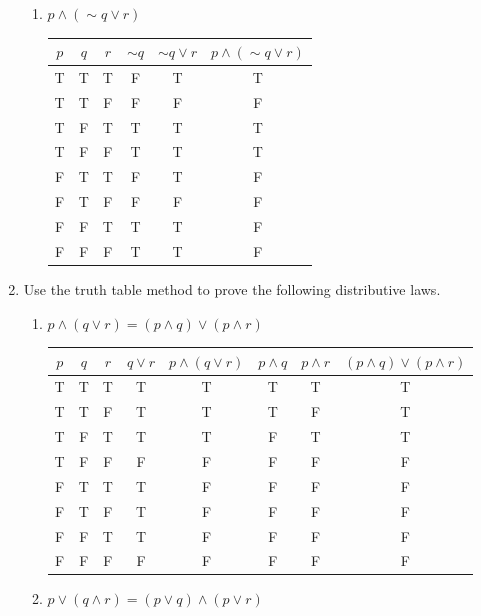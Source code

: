 \documentclass{article}
\begin{document}
\begin{enumerate}
\begin{enumerate}
			\item \( p \land (\sim q \lor r) \) \\
			
			\begin{tabular}{|c|c|c|c|c|c|}
				\hline
				$p$ & $q$ & $r$ & $\sim q$ & $\sim q \lor r$ & $p \land (\sim q \lor r)$ \\
				\hline
				T & T & T & F & T & T \\
				T & T & F & F & F & F \\
				T & F & T & T & T & T \\
				T & F & F & T & T & T \\
				F & T & T & F & T & F \\
				F & T & F & F & F & F \\
				F & F & T & T & T & F \\
				F & F & F & T & T & F \\
				\hline
			\end{tabular}
		\end{enumerate}
		
		\item Use the truth table method to prove the following distributive laws.
		\begin{enumerate}
			\item \( p \land (q \lor r) = (p \land q) \lor (p \land r) \) \\
			
			\begin{tabular}{|c|c|c|c|c|c|c|c|}
				\hline
				$p$ & $q$ & $r$ & $q \lor r$ & $p \land (q \lor r)$ & $p \land q$ & $p \land r$ & $(p \land q) \lor (p \land r)$ \\
				\hline
				T & T & T & T & T & T & T & T \\
				T & T & F & T & T & T & F & T \\
				T & F & T & T & T & F & T & T \\
				T & F & F & F & F & F & F & F \\
				F & T & T & T & F & F & F & F \\
				F & T & F & T & F & F & F & F \\
				F & F & T & T & F & F & F & F \\
				F & F & F & F & F & F & F & F \\
				\hline
			\end{tabular}
			
			\item \( p \lor (q \land r) = (p \lor q) \land (p \lor r) \) \\
			

\end{enumerate}
\end{enumerate}
\end{document}
